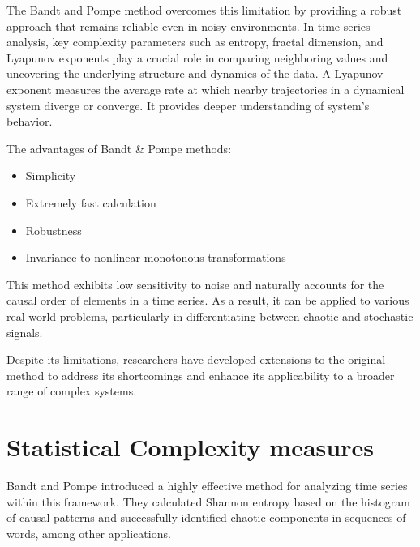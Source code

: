 The Bandt and Pompe method overcomes this limitation by providing a robust approach that remains reliable even in noisy environments. 
In time series analysis, key complexity parameters such as entropy, fractal dimension, 
and Lyapunov exponents play a crucial role in comparing neighboring values and uncovering the underlying structure and dynamics of the data. A Lyapunov exponent measures the average rate at which nearby trajectories in a dynamical system diverge or converge. It provides deeper understanding of system's behavior. 

The advantages of Bandt \& Pompe methods:
\begin{itemize}
	\item Simplicity
	\item Extremely fast calculation
	\item Robustness
	\item Invariance to nonlinear monotonous transformations
\end{itemize}	

This method exhibits low sensitivity to noise and naturally accounts for the causal order of elements in a time series. As a result, it can be applied to various real-world problems, particularly in differentiating between chaotic and stochastic signals.

Despite its limitations, researchers have developed extensions to the original method to address its shortcomings and enhance its applicability to a broader range of complex systems.

\section{Statistical Complexity measures} \label{Sec:BackgroundKnowledge}

Bandt and Pompe introduced a highly effective method for analyzing time series within this framework. They calculated Shannon entropy based on the histogram of causal patterns and successfully identified chaotic components in sequences of words, among other applications.

